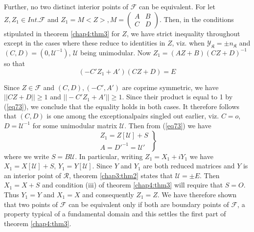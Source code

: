 \medskip
Further, no two distinct interior points of $\mathcal{F}$ can be
equivalent. For let $Z, Z_1 \in Int. \mathcal{F}$ and $Z_1 = M < Z >,
M = \begin{pmatrix} A & B \\ C & D \end{pmatrix}$. Then, in the
conditions stipulated in theorem \ref{chap4:thm3} for $Z$, we have strict
inequality throughout except in the cases where these reduce to
identities in $Z$, viz. when $\mathscr{Y}_\mathfrak{K}= \pm
n_\mathfrak{K}$ and $(C,D) = (0, \mathcal{U}^{-1})$, $\mathcal{U}$ being
unimodular. Now $Z_1 = ( AZ + B) (CZ + D)^{-1}$ so that  
\begin{equation*}
(-C' Z_1 + A') (CZ + D) = E\tag{73}\label{eq73}  
\end{equation*}
 
Since $Z \in \mathcal{F}$ and $(C, D), (-C', A')$ are coprime
symmetric, we have $|| CZ + D || \geq 1$ and $||-C'Z_1+A' || \geq
1$. Since their product is equal to 1 by (\ref{eq73}), we conclude that
the equality holds in both cases. It therefore follows that $(C, D)$ is
one among the exceptional\pageoriginale pairs singled out earlier,
viz. $C = o$, $D = \mathcal{U}^{-1}$ for some unimodular matrix
$\mathcal{U}$. Then from (\ref{eq73}) we have   
\begin{equation*}
\left.
\begin{aligned}
Z_1 = Z[\mathcal{U}] + S \\
A =D'^{-1} = \mathcal{U}'
\end{aligned}
\right \} \tag{74}\label{eq74}  
\end{equation*}
where we write $S = B \mathcal{U}$. In particular, writing $Z_1 = X_1
+  i Y_1$ we have $X_1 = X[\mathcal{U}] + S$, $Y_1 =
Y[\mathcal{U}]$. Since $Y$ and $Y_1$ are both reduced matrices and $Y$
is an interior point of $\mathscr{R}$, theorem \ref{chap3:thm2} states that
$\mathcal{U} = \pm E$. Then $X_1 = X + S$ and condition (iii) of
theorem \ref{chap4:thm3} will require that $S = O$. Thus $Y_1=Y$ and $X_1=X$ and
consequently $Z_1 = Z$. We have therefore shown that two points of
$\mathcal{F}$ can be equivalent only if both are boundary points of
$\mathcal{F}$, a property typical of a fundamental domain and this
settles the first part of theorem \ref{chap4:thm3}. 

